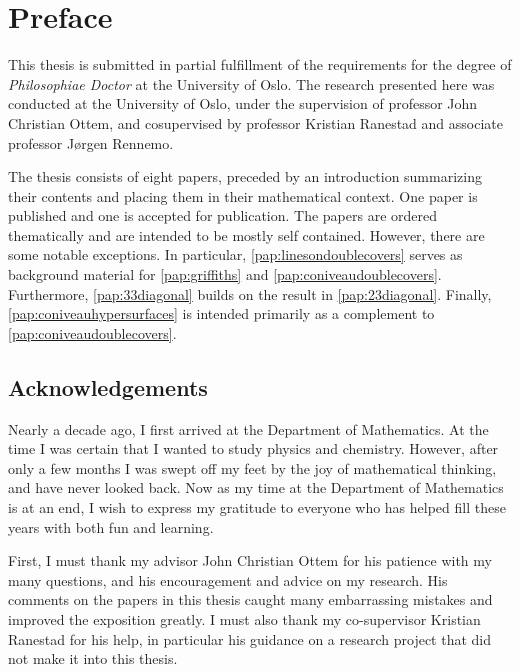 \chapter{Preface}


This thesis is submitted in partial fulfillment of the requirements
for the degree of \emph{Philosophiae Doctor} at the University of Oslo.
The research presented here was conducted at the University of Oslo,
under the supervision of professor John Christian Ottem, and cosupervised by professor Kristian Ranestad and associate professor Jørgen Rennemo.


The thesis consists of eight papers, preceded by an introduction summarizing their contents and placing them in their mathematical context. One paper is published and one is accepted for publication. The papers are ordered thematically and are intended to be mostly self contained. However, there are some notable exceptions. In particular, \cref{pap:linesondoublecovers} serves as background material for \cref{pap:griffiths} and \cref{pap:coniveaudoublecovers}. Furthermore, \cref{pap:33diagonal} builds on the result in \cref{pap:23diagonal}. Finally, \cref{pap:coniveauhypersurfaces} is intended primarily as a complement to \cref{pap:coniveaudoublecovers}.


\newpage
\section*{Acknowledgements}
Nearly a decade ago, I first arrived at the Department of Mathematics. At the time I was certain that I wanted to study physics and chemistry. However, after only a few months I was swept off my feet by the joy of mathematical thinking, and have never looked back. Now as my time at the Department of Mathematics is at an end, I wish to express my gratitude to everyone who has helped fill these years with both fun and learning.

First, I must thank my advisor John Christian Ottem for his patience with my many questions, and his encouragement and advice on my research. His comments on the papers in this thesis caught many embarrassing mistakes and improved the exposition greatly. I must also thank my co-supervisor Kristian Ranestad for his help, in particular his guidance on a research project that did not make it into this thesis.

